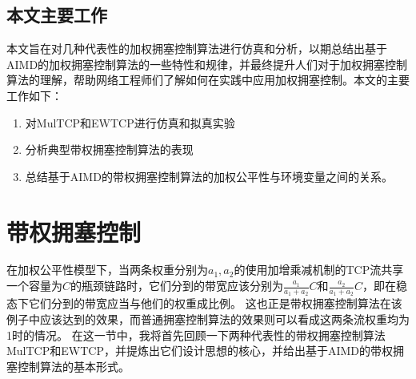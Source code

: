 \documentclass[winfonts]{njuthesis}
\begin{document}
\section{本文主要工作}
本文旨在对几种代表性的加权拥塞控制算法进行仿真和分析，以期总结出基于AIMD的加权拥塞控制算法的一些特性和规律，并最终提升人们对于加权拥塞控制算法的理解，帮助网络工程师们了解如何在实践中应用加权拥塞控制。本文的主要工作如下：
\begin{enumerate}
\item 对MulTCP和EWTCP进行仿真和拟真实验

\item 分析典型带权拥塞控制算法的表现

\item 总结基于AIMD的带权拥塞控制算法的加权公平性与环境变量之间的关系。
\end{enumerate}



\chapter{带权拥塞控制}\label{chapter:wcc}

在加权公平性模型下，当两条权重分别为$a_1, a_2$的使用加增乘减机制的TCP流共享一个容量为$C$的瓶颈链路时，它们分到的带宽应该分别为$\frac{a_1}{a_1 + a_2}C$和$\frac{a_2}{a_1 + a_2}C$，即在稳态下它们分到的带宽应当与他们的权重成比例。
这也正是带权拥塞控制算法在该例子中应该达到的效果，而普通拥塞控制算法的效果则可以看成这两条流权重均为1时的情况。
在这一节中，我将首先回顾一下两种代表性的带权拥塞控制算法MulTCP\cite{crowcroft1998differentiated}和EWTCP\cite{wischik2011design}，并提炼出它们设计思想的核心，并给出基于AIMD的带权拥塞控制算法的基本形式。
\end{document}
